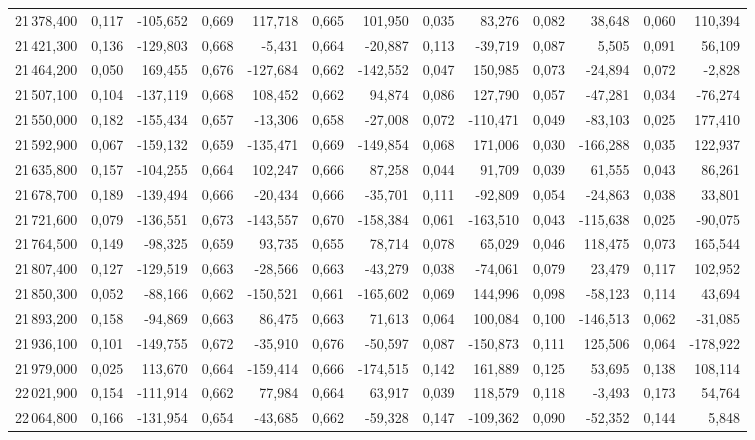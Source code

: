 \begin{longtable}{rrrrrrrrrrrrr}
21\,378,400 & 0,117 & -105,652 & 0,669 & 117,718 & 0,665 & 101,950 & 0,035 & 83,276 & 0,082 & 38,648 & 0,060 & 110,394\\
21\,421,300 & 0,136 & -129,803 & 0,668 & -5,431 & 0,664 & -20,887 & 0,113 & -39,719 & 0,087 & 5,505 & 0,091 & 56,109\\
21\,464,200 & 0,050 & 169,455 & 0,676 & -127,684 & 0,662 & -142,552 & 0,047 & 150,985 & 0,073 & -24,894 & 0,072 & -2,828\\
21\,507,100 & 0,104 & -137,119 & 0,668 & 108,452 & 0,662 & 94,874 & 0,086 & 127,790 & 0,057 & -47,281 & 0,034 & -76,274\\
21\,550,000 & 0,182 & -155,434 & 0,657 & -13,306 & 0,658 & -27,008 & 0,072 & -110,471 & 0,049 & -83,103 & 0,025 & 177,410\\
21\,592,900 & 0,067 & -159,132 & 0,659 & -135,471 & 0,669 & -149,854 & 0,068 & 171,006 & 0,030 & -166,288 & 0,035 & 122,937\\
21\,635,800 & 0,157 & -104,255 & 0,664 & 102,247 & 0,666 & 87,258 & 0,044 & 91,709 & 0,039 & 61,555 & 0,043 & 86,261\\
21\,678,700 & 0,189 & -139,494 & 0,666 & -20,434 & 0,666 & -35,701 & 0,111 & -92,809 & 0,054 & -24,863 & 0,038 & 33,801\\
21\,721,600 & 0,079 & -136,551 & 0,673 & -143,557 & 0,670 & -158,384 & 0,061 & -163,510 & 0,043 & -115,638 & 0,025 & -90,075\\
21\,764,500 & 0,149 & -98,325 & 0,659 & 93,735 & 0,655 & 78,714 & 0,078 & 65,029 & 0,046 & 118,475 & 0,073 & 165,544\\
21\,807,400 & 0,127 & -129,519 & 0,663 & -28,566 & 0,663 & -43,279 & 0,038 & -74,061 & 0,079 & 23,479 & 0,117 & 102,952\\
21\,850,300 & 0,052 & -88,166 & 0,662 & -150,521 & 0,661 & -165,602 & 0,069 & 144,996 & 0,098 & -58,123 & 0,114 & 43,694\\
21\,893,200 & 0,158 & -94,869 & 0,663 & 86,475 & 0,663 & 71,613 & 0,064 & 100,084 & 0,100 & -146,513 & 0,062 & -31,085\\
21\,936,100 & 0,101 & -149,755 & 0,672 & -35,910 & 0,676 & -50,597 & 0,087 & -150,873 & 0,111 & 125,506 & 0,064 & -178,922\\
21\,979,000 & 0,025 & 113,670 & 0,664 & -159,414 & 0,666 & -174,515 & 0,142 & 161,889 & 0,125 & 53,695 & 0,138 & 108,114\\
22\,021,900 & 0,154 & -111,914 & 0,662 & 77,984 & 0,664 & 63,917 & 0,039 & 118,579 & 0,118 & -3,493 & 0,173 & 54,764\\
22\,064,800 & 0,166 & -131,954 & 0,654 & -43,685 & 0,662 & -59,328 & 0,147 & -109,362 & 0,090 & -52,352 & 0,144 & 5,848\\

\end{longtable}
